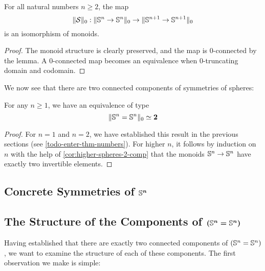 \documentclass[english,a4]{article}
\begin{document}
\begin{corollary} \label{cor:higher-spheres-2-comp}
    For all natural numbers $n \geq 2$, the map
    \begin{equation}
    \higherTrunc 0 {\susp} : \higherTrunc 0 {\Sn n \to \Sn n} \to \higherTrunc 0 {\Sn {n+1} \to \Sn {n+1}}
    \end{equation}
    is an isomorphism of monoids.
\end{corollary}
\begin{proof}
    The monoid structure is clearly preserved, and the map is $0$-connected by the lemma. A $0$-connected map becomes an equivalence when $0$-truncating domain and codomain.
\end{proof}

We now see that there are two connected components of symmetries of spheres:

\begin{theorem} \label{thm:higher-spheres-2}
    For any $n \geq 1$, we have an equivalence of type
    \begin{equation}
    \higherTrunc 0 {\Sn n= \Sn n} \weq \bn 2
    \end{equation} 
\end{theorem}
\begin{proof}
    For $n = 1$ and $n=2$, we have established this result in the previous sections (see \cref{todo-enter-thm-numbers}).
    For higher $n$, it follows by induction on $n$ with the help of \cref{cor:higher-spheres-2-comp} that the monoids $\Sn n \to \Sn n$ have exactly two invertible elements.
\end{proof}

\subsection{Concrete Symmetries of $\boldsymbol{\Sn n}$}


\subsection{The Structure of the Components of $\boldsymbol{(\Sn n = \Sn n)}$}

Having established that there are exactly two connected components of $(\Sn n = \Sn n)$, we want to examine the structure of each of these components.
The first observation we make is simple:
\end{document}
